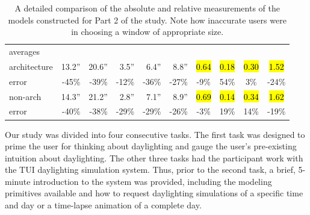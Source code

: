 \documentclass[review]{vgtc}                 %
\begin{document}
\begin{table}[b]
\begin{center}
\begin{small}
\begin{tabular}{@{}l@{~~}|@{~~}r@{~~~}r@{~~~}r@{~~~}r@{~~~}r@{~~}|@{~~}c@{~~~}c@{~~~}c@{~~~}c@{}}
averages &          &          &         &         &         &          &          &        &\\
architecture & 13.2'' & 20.6'' & 3.5''  &  6.4''  &   8.8'' &  \hl{0.64}    &  \hl{0.18}	  &  \hl{0.30}  &  \hl{1.52} \\
error   &     -45\% & -39\% & -12\% & -36\% & -27\% & -9\% & 54\% & 3\% & -24\% \\
non-arch     & 14.3'' &	21.2'' & 2.8''	&  7.1''  &   8.9'' &  \hl{0.69}    &  \hl{0.14}	  &  \hl{0.34}  &  \hl{1.62} \\
error   &     -40\% & -38\% & -29\% & -29\% & -26\% & -3\% & 19\% & 14\% & -19\%
\end{tabular}
\end{small}
\end{center}
\vspace{-0.2in}
\caption{
\label{table:measurements}
A detailed comparison of the absolute and relative measurements of the
models constructed for Part 2 of the study.  Note how inaccurate users were in choosing a window of appropriate size.
}
\end{table}


Our study was divided into four consecutive tasks.  The first task was
designed to prime the user for thinking about daylighting and gauge
the user's pre-existing intuition about daylighting.  The other three
tasks had the participant work with the TUI daylighting simulation
system.  Thus, prior to the second task, a brief, 5-minute
introduction to the system was provided, including the modeling
primitives available and how to request daylighting simulations of a
specific time and day or a time-lapse animation of a complete day.
\end{document}
